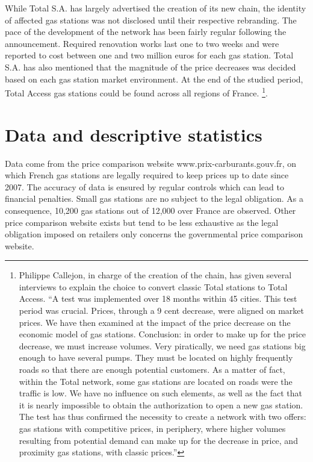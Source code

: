 \documentclass[english]{article}
\begin{document}
While Total S.A. has largely advertised the creation of its new chain, the identity of affected gas stations was not disclosed until their respective rebranding. The pace of the development of the network has been fairly regular following the announcement. Required renovation works last one to two weeks and were reported to cost between one and two million euros for each gas station. Total S.A. has also mentioned that the magnitude of the price decreases was decided based on each gas station market environment. At the end of the studied period, Total Access gas stations could be found across all regions of France.%
\footnote{Philippe Callejon, in charge of the creation of the chain, has given several interviews to explain the choice to convert classic Total stations to Total Access. ``A test was implemented over 18 months within 45 cities. This test period was crucial. Prices, through a 9 cent decrease, were aligned on market prices. We have then examined at the impact of the price decrease on the economic model of gas stations. Conclusion: in order to make up for the price decrease, we must increase volumes. Very piratically, we need gas stations big enough to have several pumps. They must be located on highly frequently roads so that there are enough potential customers. As a matter of fact, within the Total network, some gas stations are located on roads were the traffic is low. We have no influence on such elements, as well as the fact that it is nearly impossible to obtain the authorization to open a new gas station. The test has thus confirmed the necessity to create a network with two offers: gas stations with competitive prices, in periphery, where higher volumes resulting from potential demand can make up for the decrease in price, and proximity gas stations, with classic prices.''%
}.

\section{Data and descriptive statistics}

Data come from the price comparison website www.prix-carburants.gouv.fr, on which French gas stations are legally required to keep prices up to date since 2007. The accuracy of data is ensured by regular  controls which can lead to financial penalties. Small gas stations are no subject to the legal obligation. As a consequence, 10,200 gas stations out of 12,000 over France are observed. Other price comparison website exists but tend to be less exhaustive as the legal obligation imposed on retailers only concerns the governmental price comparison website. \medskip{}
\end{document}
